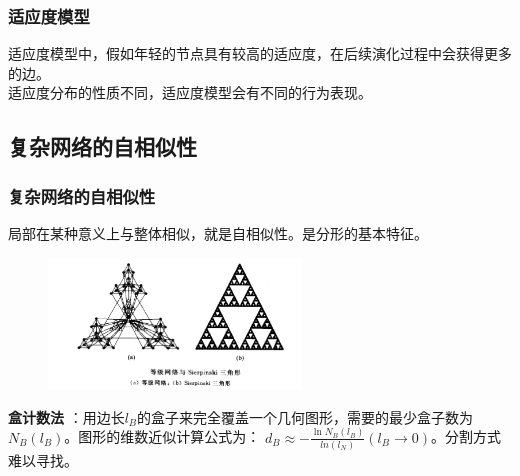 	\begin{frame}
		\frametitle{适应度模型}	
		\begin{center}	
		\end{center}
		
		适应度模型中，假如年轻的节点具有较高的适应度，在后续演化过程中会获得更多的边。\\
		适应度分布的性质不同，适应度模型会有不同的行为表现。
	\end{frame}

\subsection*{复杂网络的自相似性}

	\begin{frame}
		\frametitle{复杂网络的自相似性}
			
		局部在某种意义上与整体相似，就是自相似性。是分形的基本特征。	
			
		\begin{figure}[htbp]
			\centering
			\includegraphics[width=0.6\textwidth, bb = 0 0 884 457]{pic/01-self.png}
		\end{figure}
		\textbf{盒计数法} ：用边长$l_B$的盒子来完全覆盖一个几何图形，需要的最少盒子数为$N_B(l_B)$。图形的维数近似计算公式为：
		$d_B \approx - \frac{\ln N_B(l_B)}{ln(l_N)} (l_B \rightarrow 0)$。分割方式难以寻找。
		
	\end{frame}



